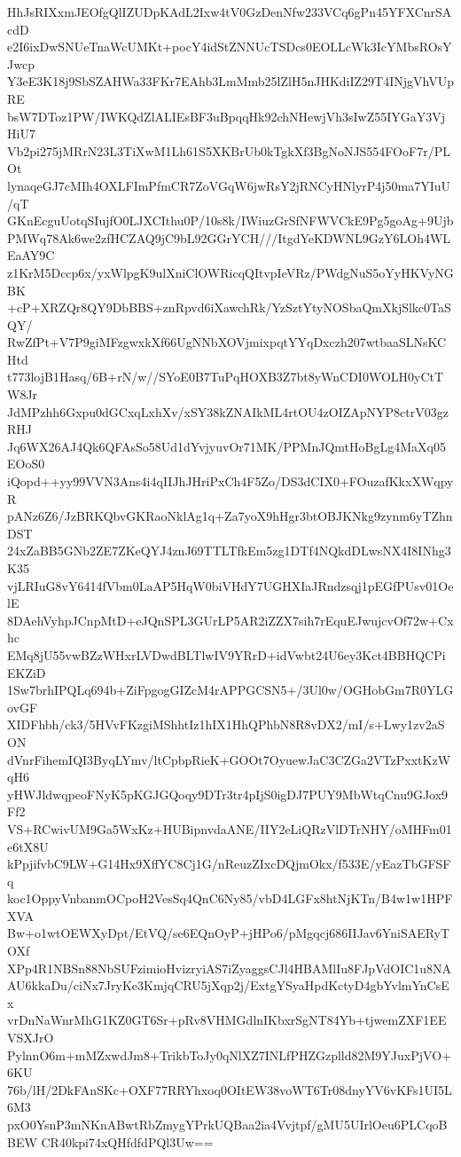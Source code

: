 HhJsRIXxmJEOfgQlIZUDpKAdL2Ixw4tV0GzDenNfw233VCq6gPn45YFXCnrSAcdD
e2I6ixDwSNUeTnaWcUMKt+pocY4idStZNNUcTSDcs0EOLLcWk3IcYMbsROsYJwcp
Y3eE3K18j9SbSZAHWa33FKr7EAhb3LmMmb25lZlH5nJHKdiIZ29T4INjgVhVUpRE
bsW7DToz1PW/IWKQdZlALIEsBF3uBpqqHk92chNHewjVh3sIwZ55IYGaY3VjHiU7
Vb2pi275jMRrN23L3TiXwM1Lh61S5XKBrUb0kTgkXf3BgNoNJS554FOoF7r/PLOt
lynaqeGJ7cMIh4OXLFImPfmCR7ZoVGqW6jwRsY2jRNCyHNlyrP4j50ma7YIuU/qT
GKnEcguUotqSIujfO0LJXCIthu0P/10s8k/IWiuzGrSfNFWVCkE9Pg5goAg+9Ujb
PMWq78Ak6we2zfHCZAQ9jC9bL92GGrYCH///ItgdYeKDWNL9GzY6LOh4WLEaAY9C
z1KrM5Dccp6x/yxWlpgK9ulXniClOWRicqQItvpIeVRz/PWdgNuS5oYyHKVyNGBK
+cP+XRZQr8QY9DbBBS+znRpvd6iXawchRk/YzSztYtyNOSbaQmXkjSlkc0TaSQY/
RwZfPt+V7P9giMFzgwxkXf66UgNNbXOVjmixpqtYYqDxczh207wtbaaSLNsKCHtd
t773lojB1Hasq/6B+rN/w//SYoE0B7TuPqHOXB3Z7bt8yWnCDI0WOLH0yCtTW8Jr
JdMPzhh6Gxpu0dGCxqLxhXv/xSY38kZNAIkML4rtOU4zOIZApNYP8ctrV03gzRHJ
Jq6WX26AJ4Qk6QFAsSo58Ud1dYvjyuvOr71MK/PPMnJQmtHoBgLg4MaXq05EOoS0
iQopd++yy99VVN3Ans4i4qIIJhJHriPxCh4F5Zo/DS3dCIX0+FOuzafKkxXWqpyR
pANz6Z6/JzBRKQbvGKRaoNklAg1q+Za7yoX9hHgr3btOBJKNkg9zynm6yTZhnDST
24xZaBB5GNb2ZE7ZKeQYJ4znJ69TTLTfkEm5zg1DTf4NQkdDLwsNX4I8INhg3K35
vjLRIuG8vY6414fVbm0LaAP5HqW0biVHdY7UGHXIaJRndzsqj1pEGfPUsv01OelE
8DAehVyhpJCnpMtD+eJQnSPL3GUrLP5AR2iZZX7sih7rEquEJwujcvOf72w+Cxhc
EMq8jU55vwBZzWHxrLVDwdBLTlwIV9YRrD+idVwbt24U6ey3Kct4BBHQCPiEKZiD
1Sw7brhIPQLq694b+ZiFpgogGIZcM4rAPPGCSN5+/3Ul0w/OGHobGm7R0YLGovGF
XIDFhbh/ck3/5HVvFKzgiMShhtIz1hIX1HhQPhbN8R8vDX2/mI/s+Lwy1zv2aSON
dVnrFihemIQI3ByqLYmv/ltCpbpRieK+GOOt7OyuewJaC3CZGa2VTzPxxtKzWqH6
yHWJldwqpeoFNyK5pKGJGQoqy9DTr3tr4pIjS0igDJ7PUY9MbWtqCnu9GJox9Ff2
VS+RCwivUM9Ga5WxKz+HUBipnvdaANE/IIY2eLiQRzVlDTrNHY/oMHFm01e6tX8U
kPpjifvbC9LW+G14Hx9XffYC8Cj1G/nReuzZIxcDQjmOkx/f533E/yEazTbGFSFq
koc1OppyVnbanmOCpoH2VesSq4QnC6Ny85/vbD4LGFx8htNjKTn/B4w1w1HPFXVA
Bw+o1wtOEWXyDpt/EtVQ/se6EQnOyP+jHPo6/pMgqcj686IIJav6YniSAERyTOXf
XPp4R1NBSn88NbSUFzimioHvizryiAS7iZyaggsCJl4HBAMlIu8FJpVdOIC1u8NA
AU6kkaDu/ciNx7JryKe3KmjqCRU5jXqp2j/ExtgYSyaHpdKctyD4gbYvlmYnCsEx
vrDnNaWnrMhG1KZ0GT6Sr+pRv8VHMGdlnIKbxrSgNT84Yb+tjwemZXF1EEVSXJrO
PylnnO6m+mMZxwdJm8+TrikbToJy0qNlXZ7INLfPHZGzplld82M9YJuxPjVO+6KU
76b/lH/2DkFAnSKc+OXF77RRYhxoq0OItEW38voWT6Tr08dnyYV6vKFs1UI5L6M3
pxO0YsnP3mNKnABwtRbZmygYPrkUQBaa2ia4Vvjtpf/gMU5UIrlOeu6PLCqoBBEW
CR40kpi74xQHfdfdPQl3Uw==

